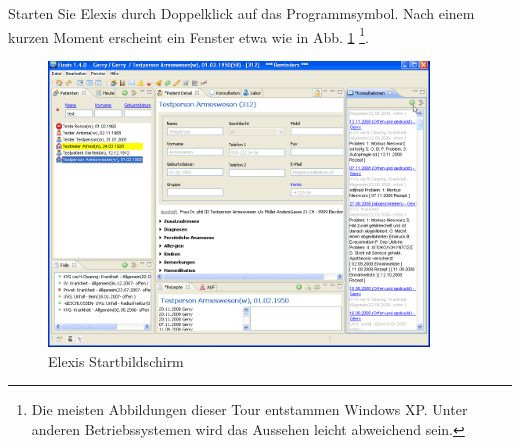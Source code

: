 
Starten Sie Elexis durch Doppelklick auf das Programmsymbol.
Nach einem kurzen Moment erscheint ein Fenster etwa wie in Abb. \ref{fig:startbild} \footnote{Die meisten Abbildungen dieser Tour entstammen Windows XP. Unter anderen Betriebssystemen wird das Aussehen leicht abweichend sein.}.
 \begin{figure}[ht]
    \center
	\includegraphics[width=0.9\textwidth]{images/einf0}
	\caption{Elexis Startbildschirm}
	\label{fig:startbild}
\end{figure}
